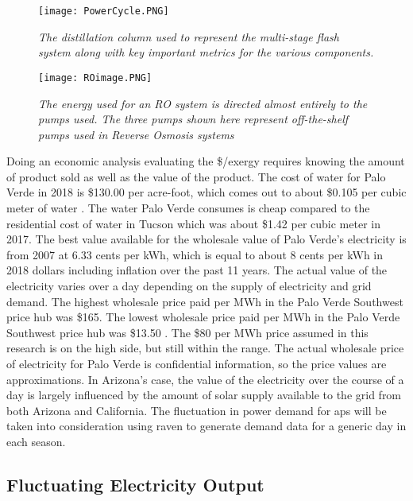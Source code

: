 \begin{figure*}[h!]
\centering
\texttt{[image: PowerCycle.PNG]}
\caption{\small \sl The distillation column used to represent the multi-stage flash system along with key important metrics for the various components.}
\label{MSF}
\centering
\end{figure*}

\begin{figure*}[h!]
\centering
\texttt{[image: ROimage.PNG]}
\caption{\small \sl The energy used for an RO system is directed almost entirely to the pumps used.  The three pumps shown here represent off-the-shelf pumps used in Reverse Osmosis systems}
\label{RO}
\centering
\end{figure*}

Doing an economic analysis evaluating the \$/exergy requires knowing the amount of product sold as well as the value of the product. The cost of water for Palo Verde in 2018 is \$130.00 per acre-foot, which comes out to about \$0.105 per cubic meter of water \cite{Brown2018}. The water Palo Verde consumes is cheap compared to the residential cost of water in Tucson which was about \$1.42 per cubic meter in 2017\cite{CityofTucson2017}. The best value available for the wholesale value of Palo Verde's electricity is from 2007 at 6.33 cents per kWh, which is equal to about 8 cents per kWh in 2018 dollars including inflation over the past 11 years. The actual value of the electricity varies over a day depending on the supply of electricity and grid demand. The highest wholesale price paid per MWh in the Palo Verde Southwest price hub was \$165.  The lowest wholesale price paid per MWh in the Palo Verde Southwest price hub was \$13.50 \cite{EIA2017}.  The \$80 per MWh price assumed in this research is on the high side, but still within the range.  The actual wholesale price of electricity for Palo Verde is confidential information, so the price values are approximations.  In Arizona's case, the value of the electricity over the course of a day is largely influenced by the amount of solar supply available to the grid from both Arizona and California. The fluctuation in power demand for \ac{aps} will be taken into consideration using \ac{raven} to generate demand data for a generic day in each season.

\subsection{Fluctuating Electricity Output}

